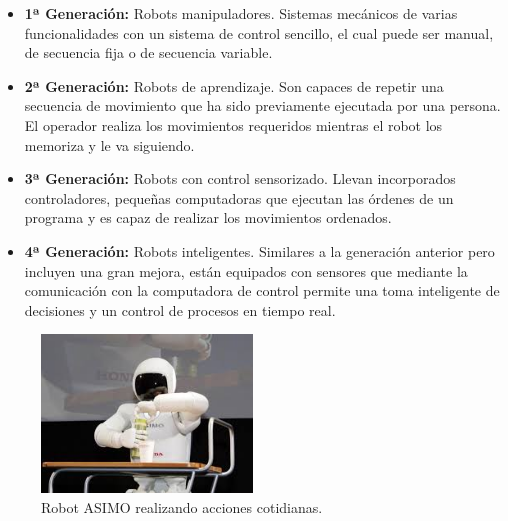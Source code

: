 \begin{itemize}
		\item \textbf{1ª Generación:} Robots manipuladores. Sistemas mecánicos de varias funcionalidades con un sistema de control sencillo, el cual puede ser manual, de secuencia fija o de secuencia variable.

	\item\textbf{2ª Generación:} Robots de aprendizaje. Son capaces de repetir una secuencia de movimiento que ha sido previamente ejecutada por una persona. El operador realiza los movimientos requeridos mientras el robot los memoriza y le va siguiendo. 

	\item\textbf{3ª Generación:} Robots con control sensorizado. Llevan incorporados controladores, pequeñas computadoras que ejecutan las órdenes de un programa y es capaz de realizar los movimientos ordenados.

	\item\textbf{4ª Generación:} Robots inteligentes. Similares a la generación anterior pero incluyen una gran mejora, están equipados con sensores que mediante la comunicación con la computadora de control permite una toma inteligente de decisiones y un control de procesos en tiempo real.
\end{itemize}

\begin{figure}[H]
	\begin{center}
		\includegraphics[width=0.5\textwidth]{imag/IMG11.jpeg}
				\caption{Robot ASIMO realizando acciones cotidianas.} 
	\label{fig:Robot ASIMO.}	
	\end{center}
\end{figure}

